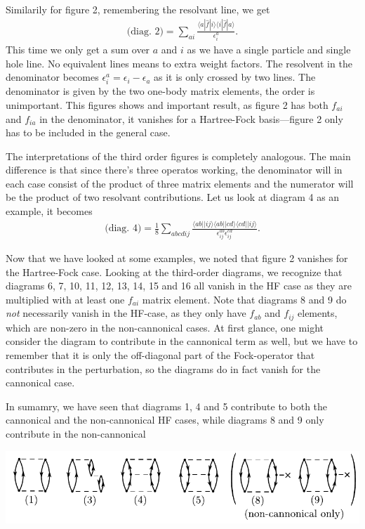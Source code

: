 \documentclass[a4paper, 11pt, notitlepage, english]{article}
\newcommand{\brakket}[2]{\langle #1 || #2 \rangle}
\newcommand{\op}[1]{\hat{#1}}
\newcommand{\braopket}[3]{\langle #1 | {#2} | #3 \rangle}
\newcommand{\eps}{\epsilon}
\begin{document}
Similarily for figure 2, remembering the resolvant line, we get
\begin{align*}
  \mbox{(diag.\ 2)} = \sum_{ai}\frac{\braopket{a}{\op{f}}{i}\braopket{i}{\op{f}}{a}}{\eps_{i}^a}.
\end{align*}
This time we only get a sum over $a$ and $i$ as we have a single particle and single hole line. No equivalent lines means to extra weight factors. The resolvent in the denominator becomes $\eps_i^a = \eps_i - \eps_a$ as it is only crossed by two lines. The denominator is given by the two one-body matrix elements, the order is unimportant. This figures shows and important result, as figure 2 has both $f_{ai}$ and $f_{ia}$ in the denominator, it vanishes for a Hartree-Fock basis---figure 2 only has to be included in the general case.

The interpretations of the third order figures is completely analogous. The main difference is that since there's three operatos working, the denominator will in each case consist of the product of three matrix elements and the numerator will be the product of two resolvant contributions. Let us look at diagram 4 as an example, it becomes
\begin{align*}
  \mbox{(diag.\ 4)} = \frac{1}{8}\sum_{abcdij}\frac{\brakket{ab}{ij}\brakket{ab}{cd}\brakket{cd}{ij}}{\eps_{ij}^{ab}\eps_{ij}^{cd}}.
\end{align*}

Now that we have looked at some examples, we noted that figure 2 vanishes for the Hartree-Fock case. Looking at the third-order diagrams, we recognize that diagrams 6, 7, 10, 11, 12, 13, 14, 15 and 16 all vanish in the HF case as they are multiplied with at least one $f_{ai}$ matrix element. Note that diagrams 8 and 9 do \emph{not} necessarily vanish in the HF-case, as they only have $f_{ab}$ and $f_{ij}$ elements, which are non-zero in the non-cannonical cases. At first glance, one might consider the diagram to contribute  in the cannonical term as well, but we have to remember that it is only the off-diagonal part of the Fock-operator that contributes in the perturbation, so the diagrams do in fact vanish for the cannonical case.

\clearpage

In sumamry, we have seen that diagrams 1, 4 and 5 contribute to both the cannonical and the non-cannonical HF cases, while diagrams 8 and 9 only contribute in the non-cannonical
\begin{center}
\includegraphics[width=\textwidth]{project2_5}
\end{center}
\end{document}
